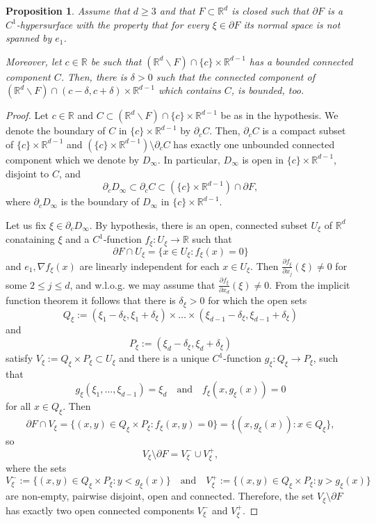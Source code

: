 \documentclass[10pt,leqno]{amsart}
\newtheorem{prop}{Proposition}%
\theoremstyle{definition}
\newcommand{\R}{\mathbb R}
\begin{document}
\begin{prop}\label{prop:C1-boundary, d>2}
	Assume that $d\geq 3$ and that $F\subset\R^d$ is closed such that $\partial F$ is a $C^1$-hypersurface with the property that for every $\xi\in \partial F$ its normal space is not spanned by $e_1$. 
	
	Moreover, let $c\in\R$ be such that $\left(\R^d\backslash F\right)\cap \{c\}\times\R^{d-1}$ has a bounded connected component $C$. Then, there is $\delta>0$ such that the connected component of $\left(\R^d\backslash F\right)\cap (c-\delta,c+\delta)\times\R^{d-1}$ which contains $C$, is bounded, too. 
\end{prop}

\begin{proof}
Let $c\in\R$ and $C\subset \left(\R^d\backslash F\right)\cap \{c\}\times\R^{d-1}$ be as in the hypothesis. We denote the boundary of $C$ in $\{c\}\times\R^{d-1}$ by $\partial_c C$. Then, $\partial_c C$ is a compact subset of $\{c\}\times\R^{d-1}$ and $\left(\{c\}\times\R^{d-1}\right)\setminus \partial_c C$ has exactly one unbounded connected component which we denote by $D_\infty$. In particular, $D_\infty$ is open in $\{c\}\times\R^{d-1}$, disjoint to $C$, and 
\begin{equation}\label{eq:set inclusion 1}
	\partial_cD_\infty\subset\partial_cC\subset\left(\{c\}\times\R^{d-1}\right)\cap \partial F,
\end{equation}
where $\partial_c D_\infty$ is the boundary of $D_\infty$ in $\{c\}\times\R^{d-1}$. 

Let us fix $\xi\in\partial_c D_\infty$. By hypothesis, there is an open, connected subset $U_\xi$ of $\R^d$ conataining $\xi$ and a $C^1$-function $f_\xi:U_\xi\rightarrow \R$ such that
	$$\partial F\cap U_\xi=\{x\in U_\xi \colon f_\xi(x)=0\}$$
	and $e_1, \nabla f_\xi(x)$ are linearly independent for each $x\in U_\xi$. 
Then
$\frac{\partial f_\xi}{\partial x_j}(\xi)\neq0$ for some $2\leq j\leq d$, and w.l.o.g. we may assume that $\frac{\partial f_\xi}{\partial x_d}(\xi)\neq0$. 
From the implicit function theorem it follows that there is $\delta_\xi>0$ for which the open sets
$$Q_\xi:=(\xi_1-\delta_\xi,\xi_1+\delta_\xi)\times\ldots\times(\xi_{d-1}-\delta_\xi,\xi_{d-1}+\delta_\xi)$$
and
$$P_\xi:=(\xi_d-\delta_\xi,\xi_d+\delta_\xi)$$
satisfy $V_\xi:=Q_\xi\times P_\xi\subset U_\xi$ and there is a unique
$C^1$-function $g_\xi\colon Q_\xi\to P_\xi$,
such that
$$g_\xi(\xi_1,\ldots,\xi_{d-1})=\xi_d\quad\text{and}\quad f_\xi(x,g_\xi(x))=0$$
for all $x\in Q_\xi$.
Then 
$$\partial F\cap V_\xi=\{(x,y)\in Q_\xi\times P_\xi\colon f_\xi(x,y)=0\}=\{(x,g_\xi(x))\colon x\in Q_\xi\},$$ 
so
$$V_\xi\setminus\partial F=V_\xi^-\cup V_\xi^+,$$
where the sets
$$V_\xi^-:=\{(x,y)\in Q_\xi\times P_\xi\colon y<g_\xi(x)\}\quad\text{and}\quad
V_\xi^+:=\{(x,y)\in Q_\xi\times P_\xi\colon y>g_\xi(x)\}$$
are non-empty, pairwise disjoint, open and connected. Therefore, the set $V_\xi\setminus\partial F$ has exactly two open connected components $V_\xi^-$ and $V_\xi^+$.


\end{proof}
\end{document}
